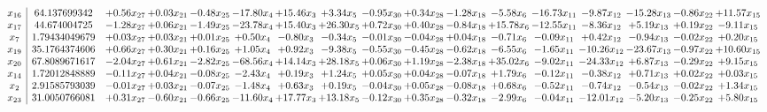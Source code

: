 \documentclass[9pt]{article}
\begin{document}
 \[\begin{array}{c| c c@{\hskip 2pt} c@{\hskip 2pt} c@{\hskip 2pt} c@{\hskip 2pt} c@{\hskip 2pt} c@{\hskip 2pt} c@{\hskip 2pt} c@{\hskip 2pt} c@{\hskip 2pt} c@{\hskip 2pt} c@{\hskip 2pt} c@{\hskip 2pt} c@{\hskip 2pt} c@{\hskip 2pt} c@{\hskip 2pt} }
 x_{16}   &  64.137699342 & +  0.56 x_{27} & +  0.03 x_{21} & -0.48 x_{25} & -17.80 x_{4} & + 15.46 x_{3} & +  3.34 x_{5} & -0.95 x_{30} & +  0.34 x_{28} & -1.28 x_{18} & -5.58 x_{6} & -16.73 x_{11} & -9.87 x_{12} & -15.28 x_{13} & -0.86 x_{22} & + 11.57 x_{15}\\
 x_{17}   &  44.674004725 & -1.28 x_{27} & +  0.06 x_{21} & -1.49 x_{25} & -23.78 x_{4} & + 15.40 x_{3} & + 26.30 x_{5} & +  0.72 x_{30} & +  0.40 x_{28} & -0.84 x_{18} & + 15.78 x_{6} & -12.55 x_{11} & -8.36 x_{12} & +  5.19 x_{13} & +  0.19 x_{22} & -9.11 x_{15}\\
 x_{7}   &  1.79434049679 & +  0.03 x_{27} & +  0.03 x_{21} & +  0.01 x_{25} & +  0.50 x_{4} & -0.80 x_{3} & -0.34 x_{5} & -0.01 x_{30} & -0.04 x_{28} & +  0.04 x_{18} & -0.71 x_{6} & -0.09 x_{11} & +  0.42 x_{12} & -0.94 x_{13} & -0.02 x_{22} & +  0.20 x_{15}\\
 x_{19}   &  35.1764374606 & +  0.66 x_{27} & +  0.30 x_{21} & +  0.16 x_{25} & +  1.05 x_{4} & +  0.92 x_{3} & -9.38 x_{5} & -0.55 x_{30} & -0.45 x_{28} & -0.62 x_{18} & -6.55 x_{6} & -1.65 x_{11} & -10.26 x_{12} & -23.67 x_{13} & -0.97 x_{22} & + 10.60 x_{15}\\
 x_{20}   &  67.8089671617 & -2.04 x_{27} & +  0.61 x_{21} & -2.82 x_{25} & -68.56 x_{4} & + 14.14 x_{3} & + 28.18 x_{5} & +  0.06 x_{30} & +  1.19 x_{28} & -2.38 x_{18} & + 35.02 x_{6} & -9.02 x_{11} & -24.33 x_{12} & +  6.87 x_{13} & -0.29 x_{22} & +  9.15 x_{15}\\
 x_{14}   &  1.72012848889 & -0.11 x_{27} & +  0.04 x_{21} & -0.08 x_{25} & -2.43 x_{4} & +  0.19 x_{3} & +  1.24 x_{5} & +  0.05 x_{30} & +  0.04 x_{28} & -0.07 x_{18} & +  1.79 x_{6} & -0.12 x_{11} & -0.38 x_{12} & +  0.71 x_{13} & +  0.02 x_{22} & +  0.03 x_{15}\\
 x_{2}   &  2.91585793039 & -0.01 x_{27} & +  0.03 x_{21} & -0.07 x_{25} & -1.48 x_{4} & +  0.63 x_{3} & +  0.19 x_{5} & -0.04 x_{30} & +  0.05 x_{28} & -0.08 x_{18} & +  0.68 x_{6} & -0.52 x_{11} & -0.74 x_{12} & -0.54 x_{13} & -0.02 x_{22} & +  1.34 x_{15}\\
 x_{23}   &  31.0050766081 & +  0.31 x_{27} & -0.60 x_{21} & -0.66 x_{25} & -11.60 x_{4} & + 17.77 x_{3} & + 13.18 x_{5} & -0.12 x_{30} & +  0.35 x_{28} & -0.32 x_{18} & -2.99 x_{6} & -0.04 x_{11} & -12.01 x_{12} & -5.20 x_{13} & -0.25 x_{22} & +  5.80 x_{15}\\

\end{array}\]
\end{document}
